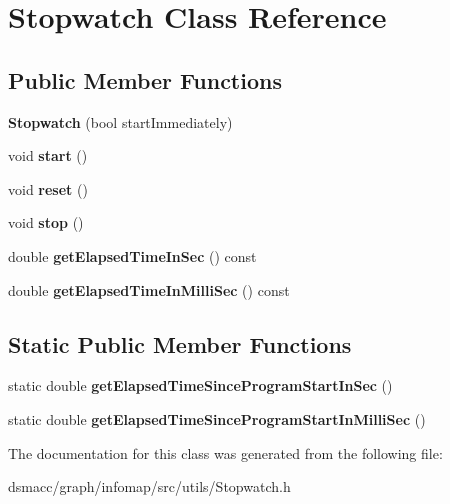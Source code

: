 \hypertarget{classStopwatch}{}\section{Stopwatch Class Reference}
\label{classStopwatch}
\subsection*{Public Member Functions}
\begin{DoxyCompactItemize}
\item 
\mbox{\label{classStopwatch_a19ac469c38baa95595406832848120cb}} 
{\bfseries Stopwatch} (bool start\+Immediately)
\item 
\mbox{\label{classStopwatch_a6d01ecc80c92f1d5210cd9c3eb72883d}} 
void {\bfseries start} ()
\item 
\mbox{\label{classStopwatch_a42c7014e7fffcf4c56ca6fb07f8eb31c}} 
void {\bfseries reset} ()
\item 
\mbox{\label{classStopwatch_aa0266311b7392b948061bb985b49cff4}} 
void {\bfseries stop} ()
\item 
\mbox{\label{classStopwatch_a1840e126e95365e8d06cd4546a90837b}} 
double {\bfseries get\+Elapsed\+Time\+In\+Sec} () const
\item 
\mbox{\label{classStopwatch_a838b8de8c5c25662f9282701217d71be}} 
double {\bfseries get\+Elapsed\+Time\+In\+Milli\+Sec} () const
\end{DoxyCompactItemize}
\subsection*{Static Public Member Functions}
\begin{DoxyCompactItemize}
\item 
\mbox{\label{classStopwatch_ab27e60f0dbd487ec65d718010d706c49}} 
static double {\bfseries get\+Elapsed\+Time\+Since\+Program\+Start\+In\+Sec} ()
\item 
\mbox{\label{classStopwatch_a34dfeba42c95a65506c6c6c224d091d8}} 
static double {\bfseries get\+Elapsed\+Time\+Since\+Program\+Start\+In\+Milli\+Sec} ()
\end{DoxyCompactItemize}


The documentation for this class was generated from the following file\+:\begin{DoxyCompactItemize}
\item 
dsmacc/graph/infomap/src/utils/Stopwatch.\+h\end{DoxyCompactItemize}
